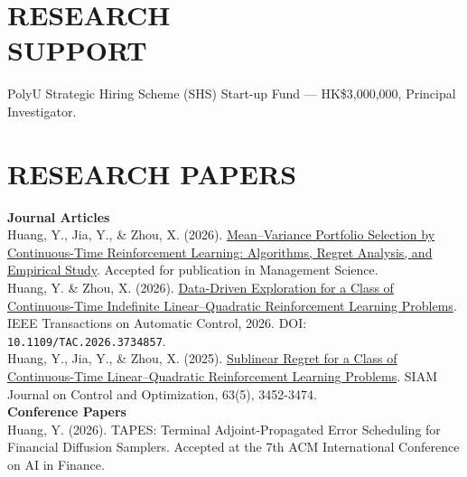 \documentclass[margin, 10pt]{res} %
\begin{document}
\begin{resume}

\section{RESEARCH \\ SUPPORT}

PolyU Strategic Hiring Scheme (SHS) Start-up Fund --- HK\$3,000,000, \newline
\hspace*{1em}Principal Investigator.\\




\section{RESEARCH PAPERS} 
\textbf{Journal Articles}\\
Huang, Y., Jia, Y., \& Zhou, X. (2026). \href{https://yiliehuang.github.io/files/MV_ArXiv.pdf}{Mean--Variance Portfolio Selection by Continuous-Time Reinforcement Learning: Algorithms, Regret Analysis, and Empirical Study}. Accepted for publication in Management Science.\\

Huang, Y. \& Zhou, X. (2026). \href{https://doi.org/10.1109/TAC.2026.3734857}{Data-Driven Exploration for a Class of Continuous-Time Indefinite Linear--Quadratic Reinforcement Learning Problems}. IEEE Transactions on Automatic Control, 2026. DOI: {\nolinkurl{10.1109/TAC.2026.3734857}}.\\

Huang, Y., Jia, Y., \& Zhou, X. (2025). \href{https://doi.org/10.1137/24M1695075}{Sublinear Regret for a Class of Continuous-Time Linear--Quadratic Reinforcement Learning Problems}. SIAM Journal on Control and Optimization, 63(5), 3452-3474.\\

\textbf{Conference Papers}\\
Huang, Y. (2026). TAPES: Terminal Adjoint-Propagated Error Scheduling for Financial Diffusion Samplers. Accepted at the 7th ACM International Conference on AI in Finance.\\


\end{resume}
\end{document}
